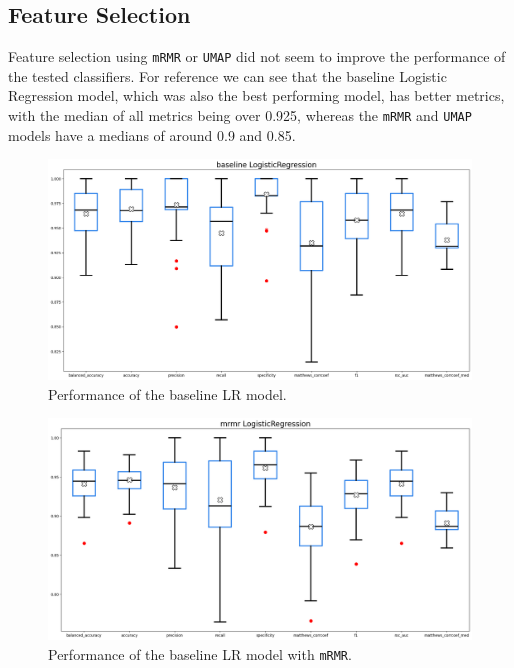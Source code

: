 \documentclass[12pt]{article}
\begin{document}
\subsection{Feature Selection}

Feature selection using \texttt{mRMR} or \texttt{UMAP} did not seem to improve
the performance of the tested classifiers. For reference we can see that the
baseline Logistic Regression model, which was also the best performing model,
has better metrics, with the median of all metrics being over 0.925, whereas the
\texttt{mRMR} and \texttt{UMAP} models have a medians of around 0.9 and 0.85.

\begin{figure}[H]
    \centering
    \includegraphics[width=\textwidth]{ims/baseline_logistic.png}
    \caption{Performance of the baseline LR model.}
    \label{fig:baseline_logistic}
\end{figure}

\begin{figure}[H]
    \centering
    \includegraphics[width=\textwidth]{ims/mrmr_logistic.png}
    \caption{Performance of the baseline LR model with \texttt{mRMR}.}
    \label{fig:mrmr_logistic}
\end{figure}
\end{document}
